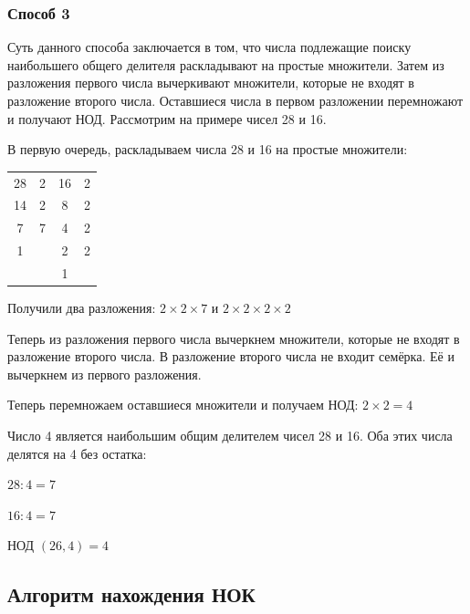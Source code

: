 \documentclass[12pt]{article}
\begin{document}
\subsubsection{Способ 3}
Суть данного способа заключается в том, что числа подлежащие поиску наибольшего общего делителя раскладывают на простые множители. Затем из разложения первого числа вычеркивают множители, которые не входят в разложение второго числа. Оставшиеся числа в первом разложении перемножают и получают НОД. Рассмотрим на примере чисел 28 и 16.\par
В первую очередь, раскладываем числа 28 и 16 на простые множители:\par
\begin{tabular}{c|cc|c}
    28 & 2 & 16 & 2 \\
    14 & 2 & 8  & 2 \\
    7  & 7 & 4  & 2 \\
    1  &   & 2  & 2 \\
       &   & 1
\end{tabular}\par
Получили два разложения: $2 \times 2 \times 7$ и $2 \times 2 \times 2 \times 2$\par
Теперь из разложения первого числа вычеркнем множители, которые не входят в разложение второго числа. В разложение второго числа не входит семёрка. Её и вычеркнем из первого разложения.\par
Теперь перемножаем оставшиеся множители и получаем НОД: $2 \times 2 = 4$\par
Число 4 является наибольшим общим делителем чисел 28 и 16. Оба этих числа делятся на 4 без остатка:\par
$28 : 4 = 7$\par
$16 : 4 = 7$\par
НОД $(26,4)=4$\par

\subsection{Алгоритм нахождения НОК}
\end{document}
